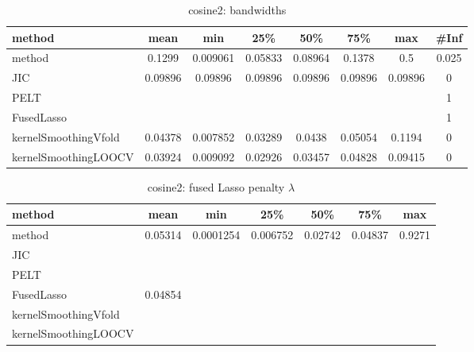 \begin{table}[ht]
\centering
\begin{tabular}{l|c|ccccc|c}
  \hline
method & mean & min & 25\% & 50\% & 75\% & max & \#Inf \\ 
  \hline
method & 0.1299 & 0.009061 & 0.05833 & 0.08964 & 0.1378 &   0.5 & 0.025 \\ 
  JIC & 0.09896 & 0.09896 & 0.09896 & 0.09896 & 0.09896 & 0.09896 &   0 \\ 
  PELT &  &  &  &  &  &  &   1 \\ 
  FusedLasso &  &  &  &  &  &  &   1 \\ 
  kernelSmoothingVfold & 0.04378 & 0.007852 & 0.03289 & 0.0438 & 0.05054 & 0.1194 &   0 \\ 
  kernelSmoothingLOOCV & 0.03924 & 0.009092 & 0.02926 & 0.03457 & 0.04828 & 0.09415 &   0 \\ 
   \hline
\end{tabular}
\caption{cosine2: bandwidths} 
\label{tab:cosine2Bandwidths}
\end{table}
\begin{table}[ht]
\centering
\begin{tabular}{l|c|ccccc}
  \hline
method & mean & min & 25\% & 50\% & 75\% & max \\ 
  \hline
method & 0.05314 & 0.0001254 & 0.006752 & 0.02742 & 0.04837 & 0.9271 \\ 
  JIC &  &  &  &  &  &  \\ 
  PELT &  &  &  &  &  &  \\ 
  FusedLasso & 0.04854 &  &  &  &  &  \\ 
  kernelSmoothingVfold &  &  &  &  &  &  \\ 
  kernelSmoothingLOOCV &  &  &  &  &  &  \\ 
   \hline
\end{tabular}
\caption{cosine2: fused Lasso penalty $\lambda$} 
\label{tab:cosine2Lambdas}
\end{table}
